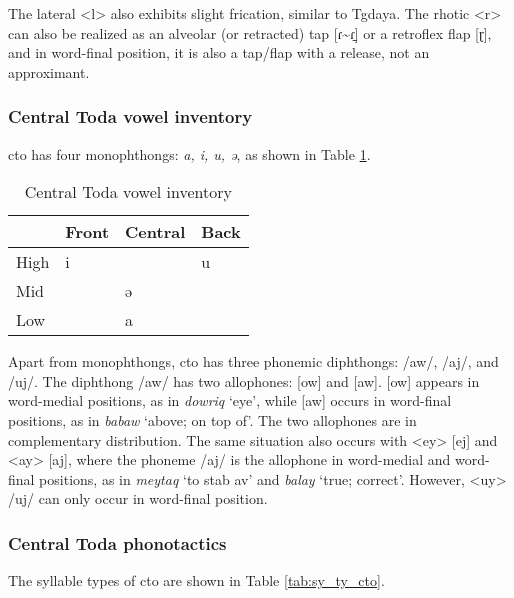 The lateral <l> also exhibits slight frication, similar to Tgdaya. The rhotic <r> can also be realized as an alveolar (or retracted) tap [ɾ\~{}ɾ̠] or a retroflex flap [ɽ], and in word-final position, it is also a tap/flap with a release, not an approximant.

\subsubsection{Central Toda vowel inventory}

\acl{cto} has four monophthongs: \textit{a, i, u, ə}, as shown in Table \ref{tab:ctoV}.

\begin{table}[!htbp]
\centering
\caption{Central Toda vowel inventory}
\label{tab:ctoV}
\begin{tabular}{llll}
\hline
     & Front & Central & Back \\ \hline
High &  i    &         &  u   \\
Mid  &       &  ə      &      \\
Low  &       &  a      &      \\ \hline
\end{tabular}
\end{table}

Apart from monophthongs, \acl{cto} has three phonemic diphthongs: /aw/, /aj/, and /uj/. The diphthong /aw/ has two allophones: [ow] and [aw]. [ow] appears in word-medial positions, as in \textit{dowriq} `eye', while [aw] occurs in word-final positions, as in \textit{babaw} `above; on top of'. The two allophones are in complementary distribution. The same situation also occurs with <ey> [ej] and <ay> [aj], where the phoneme /aj/ is the allophone in word-medial and word-final positions, as in \textit{meytaq} `to stab \acs{av}' and \textit{balay} `true; correct'. However, <uy> /uj/ can only occur in word-final position.

\subsubsection{Central Toda phonotactics} \label{sec:cto_phonotactics}

The syllable types of \acl{cto} are shown in Table \ref{tab:sy_ty_cto}. 

